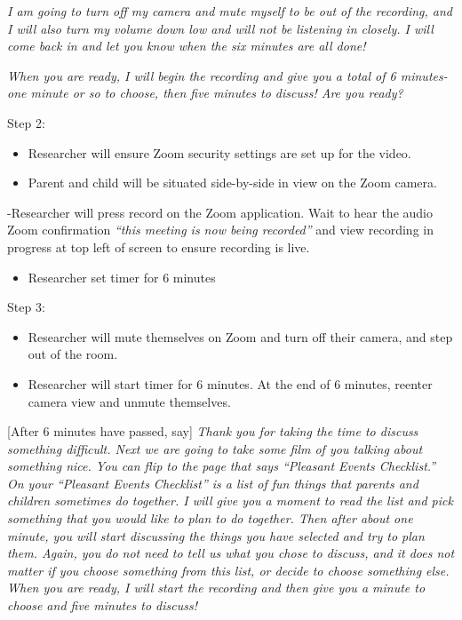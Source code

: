 \documentclass[
]{book}
\providecommand{\tightlist}{%
  \setlength{\itemsep}{0pt}\setlength{\parskip}{0pt}}
\begin{document}
\emph{I am going to turn off my camera and mute myself to be out of the recording, and I will also turn my volume down low and will not be listening in closely. I will come back in and let you know when the six minutes are all done!}

\emph{When you are ready, I will begin the recording and give you a total of 6 minutes- one minute or so to choose, then five minutes to discuss! Are you ready?}

Step 2:

\begin{itemize}
\item
  Researcher will ensure Zoom security settings are set up for the video.
\item
  Parent and child will be situated side-by-side in view on the Zoom camera.
\end{itemize}

-Researcher will press record on the Zoom application. Wait to hear the audio Zoom confirmation \emph{``this meeting is now being recorded''} and view recording in progress at top left of screen to ensure recording is live.

\begin{itemize}
\tightlist
\item
  Researcher set timer for 6 minutes
\end{itemize}

Step 3:

\begin{itemize}
\item
  Researcher will mute themselves on Zoom and turn off their camera, and step out of the room.
\item
  Researcher will start timer for 6 minutes. At the end of 6 minutes, reenter camera view and unmute themselves.
\end{itemize}

{[}After 6 minutes have passed, say{]} \emph{Thank you for taking the time to discuss something difficult. Next we are going to take some film of you talking about something nice. You can flip to the page that says ``Pleasant Events Checklist.'' On your ``Pleasant Events Checklist'' is a list of fun things that parents and children sometimes do together. I will give you a moment to read the list and pick something that you would like to plan to do together. Then after about one minute, you will start discussing the things you have selected and try to plan them. Again, you do not need to tell us what you chose to discuss, and it does not matter if you choose something from this list, or decide to choose something else. When you are ready, I will start the recording and then give you a minute to choose and five minutes to discuss!}
\end{document}

